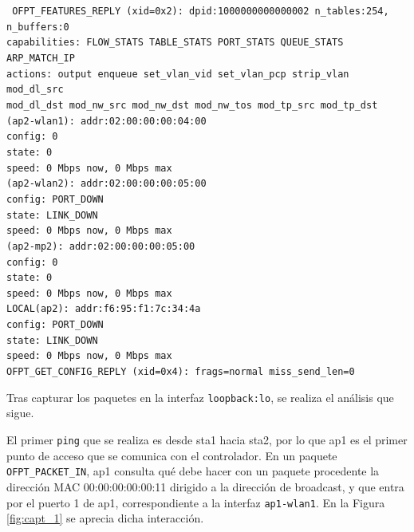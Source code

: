 \documentclass[a4paper,12pt,twoside,spanish]{book}
\begin{document}
\noindent\texttt{
\indent OFPT\_FEATURES\_REPLY (xid=0x2): dpid:1000000000000002 n\_tables:254, \\
\indent \indent n\_buffers:0\\
\indent capabilities: FLOW\_STATS TABLE\_STATS PORT\_STATS QUEUE\_STATS \\ 
\indent \indent ARP\_MATCH\_IP \\
\indent actions: output enqueue set\_vlan\_vid set\_vlan\_pcp strip\_vlan mod\_dl\_src \\ 
\indent \indent mod\_dl\_dst mod\_nw\_src mod\_nw\_dst mod\_nw\_tos mod\_tp\_src mod\_tp\_dst\\
(ap2-wlan1): addr:02:00:00:00:04:00\\
\indent \indent config:     0\\
\indent \indent state:      0\\
\indent \indent speed: 0 Mbps now, 0 Mbps max\\
(ap2-wlan2): addr:02:00:00:00:05:00\\
\indent \indent config:     PORT\_DOWN\\
\indent \indent state:      LINK\_DOWN\\
\indent \indent speed: 0 Mbps now, 0 Mbps max\\
(ap2-mp2): addr:02:00:00:00:05:00\\
\indent \indent config:     0\\
\indent \indent state:      0\\
\indent \indent speed: 0 Mbps now, 0 Mbps max\\
\indent LOCAL(ap2): addr:f6:95:f1:7c:34:4a\\
\indent \indent config:     PORT\_DOWN\\
\indent \indent state:      LINK\_DOWN\\
\indent \indent speed: 0 Mbps now, 0 Mbps max\\
\indent OFPT\_GET\_CONFIG\_REPLY (xid=0x4): frags=normal miss\_send\_len=0
}\par 

Tras capturar los paquetes en la interfaz \texttt{loopback:lo}, se realiza el análisis que sigue.\par 

El primer \texttt{ping} que se realiza es desde sta1 hacia sta2, por lo que ap1 es el primer punto de acceso que se comunica con el controlador. En un paquete \texttt{OFPT\_PACKET\_IN}, ap1 consulta qué debe hacer con un paquete procedente la dirección MAC 00:00:00:00:00:11 dirigido a la dirección de broadcast, y que entra por el puerto 1 de ap1, correspondiente a la interfaz \texttt{ap1-wlan1}. En la Figura \ref{fig:capt_1} se aprecia dicha interacción.\par 
\end{document}
